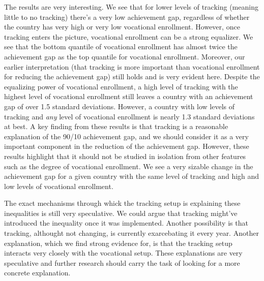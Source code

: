 \documentclass[11pt, a4paper]{article}\usepackage[]{graphicx}\usepackage[]{color}
\begin{document}

The results are very interesting. We see that for lower levels of tracking (meaning little to no tracking) there's a very low achievement gap, regardless of whether the country has very high or very low vocational enrollment. However, once tracking enters the picture, vocational enrollment can be a strong equalizer. We see that the bottom quantile of vocational enrollment has almost twice the achievement gap as the top quantile for vocational enrollment. Moreover, our earlier interpretation (that tracking is more important than vocational enrollment for reducing the achievement gap) still holds and is very evident here. Despite the equalizing power of vocational enrollment, a high level of tracking with the highest level of vocational enrollment still leaves a country with an achievement gap of over 1.5 standard deviations. However, a country with low levels of tracking and \textit{any} level of vocational enrollment is nearly 1.3 standard deviations at best. A key finding from these results is that tracking is a reasonable explanation of the 90/10 achievement gap, and we should consider it as a very important component in the reduction of the achievement gap. However, these results highlight that it should not be studied in isolation from other features such as the degree of vocational enrollment. We see a very sizable change in the achievement gap for a given country with the same level of tracking and high and low levels of vocational enrollment.

The exact mechanisms through whick the tracking setup is explaining these inequalities is still very speculative. We could argue that tracking might've introduced the inequality once it was implemented. Another possibility is that tracking, althought not changing, is currently exarcebating it every year. Another explanation, which we find strong evidence for, is that the tracking setup interacts very closely with the vocational setup. These explanations are very speculative and further research should carry the task of looking for a more concrete explanation.

\end{document}
